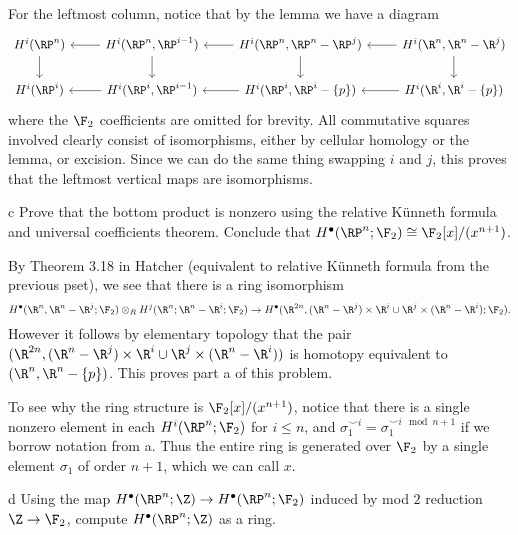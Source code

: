 \documentclass[11pt,letterpaper]{article}
\begin{document}
\begin{solution}
    \quad For the leftmost column, notice that by the lemma we have a diagram
    \[\begin{tikzcd}
        {H^i(\RP^n)} & {H^i(\RP^n,\RP^{i-1})} & {H^i(\RP^n, \RP^n-\RP^j)} & {H^i(\R^n,\R^n-\R^j)} \\
        {H^i(\RP^i)} & {H^i(\RP^i, \RP^{i-1})} & {H^i(\RP^i,\RP^i-\{p\})} & {H^i(\R^i,\R^i-\{p\})}
        \arrow[from=1-1, to=2-1]
        \arrow[from=1-2, to=2-2]
        \arrow[from=1-2, to=1-1]
        \arrow[from=2-2, to=2-1]
        \arrow[from=1-3, to=1-2]
        \arrow[from=2-3, to=2-2]
        \arrow[from=1-3, to=2-3]
        \arrow[from=1-4, to=2-4]
        \arrow[from=1-4, to=1-3]
        \arrow[from=2-4, to=2-3]
    \end{tikzcd}\]
    where the $\F_2$ coefficients are omitted for brevity. All commutative squares involved clearly consist of isomorphisms, either by cellular homology or the lemma, or excision. Since we can do the same thing swapping $i$ and $j$, this proves that the leftmost vertical maps are isomorphisms.


    \begin{partproblem}{c}
        Prove that the bottom product is nonzero using the relative K\"unneth formula and universal coefficients theorem. Conclude that $H^\bullet(\RP^n; \F_2)\cong \F_2[x] /(x^{n+1})$.
    \end{partproblem}

    \quad By Theorem 3.18 in Hatcher (equivalent to relative K\"unneth formula from the previous pset), we see that there is a ring isomorphism
    \[
        H^\bullet(\R^n, \R^n-\R^j; \F_2)\otimes_R H^j(\R^n; \R^n -\R^i; \F_2) \to H^\bullet(\R^{2n},(\R^n-\R^j)\times \R^i\cup \R^j\times (\R^n-\R^i); \F_2)
    .\] 
    However it follows by elementary topology that the pair $(\R^{2n},(\R^n-\R^j)\times \R^i\cup \R^j\times (\R^n-\R^i))$ is homotopy equivalent to $(\R^n, \R^n-\{p\})$. This proves part a of this problem.

    \quad To see why the ring structure is $\F_2[x] /(x^{n+1})$, notice that there is a single nonzero element in each $H^i(\RP^n; \F_2)$ for $i\leq n$, and $\sigma_1^{\smile i} = \sigma_1^{\smile i\mod {n+1}}$ if we borrow notation from a. Thus the entire ring is generated over $\F_2$ by a single element $\sigma_1$ of order $n+1$, which we can call $x$. 

    \begin{partproblem}{d}
        Using the map $H^\bullet(\RP^n; \Z) \to H^\bullet(\RP^n; \F_2)$ induced by mod $2$ reduction $\Z \to \F_2$, compute $H^\bullet(\RP^n; \Z)$ as a ring.
    \end{partproblem}


\end{solution}
\end{document}
